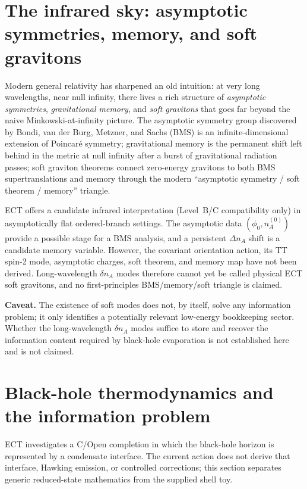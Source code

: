 \documentclass[11pt,a4paper]{article}
\begin{document}
\section{The infrared sky: asymptotic symmetries, memory, and soft gravitons}
\label{sec:pop_ir_soft}

Modern general relativity has sharpened an old intuition: at very
long wavelengths, near null infinity, there lives a rich structure of
\emph{asymptotic symmetries}, \emph{gravitational memory}, and
\emph{soft gravitons} that goes far beyond the naive
Minkowski-at-infinity picture. The asymptotic symmetry group
discovered by Bondi, van der Burg, Metzner, and Sachs (BMS) is an
infinite-dimensional extension of Poincar\'e symmetry; gravitational
memory is the permanent shift left behind in the metric at null
infinity after a burst of gravitational radiation passes; soft
graviton theorems connect zero-energy gravitons to both BMS
supertranslations and memory through the modern ``asymptotic symmetry
/ soft theorem / memory'' triangle.

ECT offers a candidate infrared interpretation (Level~B/C
compatibility only) in asymptotically flat ordered-branch settings.  The
asymptotic data $(\phi_0,n_A^{(0)})$ provide a possible stage for a BMS
analysis, and a persistent $\Delta n_A$ shift is a candidate memory variable.
However, the covariant orientation action, its TT spin-2 mode, asymptotic
charges, soft theorem, and memory map have not been derived.  Long-wavelength
$\delta n_A$ modes therefore cannot yet be called physical ECT soft gravitons,
and no first-principles BMS/memory/soft triangle is claimed.

\textbf{Caveat.}
The existence of soft modes does not, by itself, solve any
information problem; it only identifies a potentially relevant
low-energy bookkeeping sector. Whether the long-wavelength
$\delta n_A$ modes suffice to store and recover the information
content required by black-hole evaporation is not established here
and is not claimed.


\section{Black-hole thermodynamics and the information problem}

ECT investigates a C/Open completion in which the black-hole horizon is
represented by a condensate interface.  The current action does not derive
that interface, Hawking emission, or controlled corrections; this section
separates generic reduced-state mathematics from the supplied shell toy.
\end{document}
